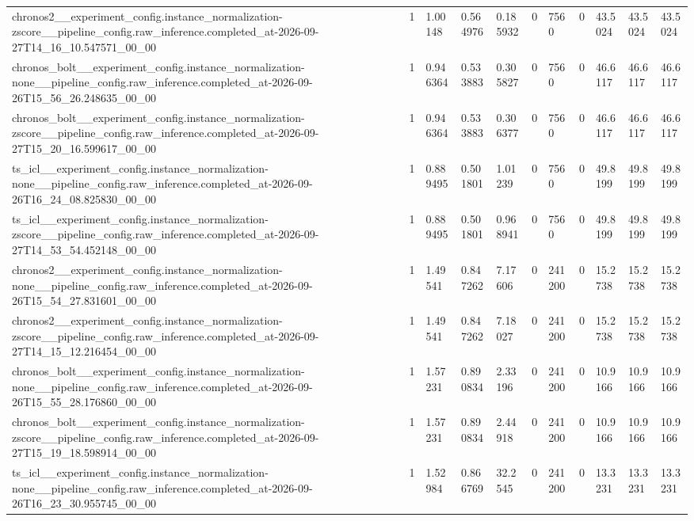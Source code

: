 \begin{tabular}{lllllllllll}
chronos2\_\_experiment\_config.instance\_normalization-zscore\_\_pipeline\_config.raw\_inference.completed\_at-2026-09-27T14\_16\_10.547571\_00\_00 & 1 & 1.00148 & 0.564976 & 0.185932 & 0 & 7560 & 0 & 43.5024 & 43.5024 & 43.5024 \\
chronos\_bolt\_\_experiment\_config.instance\_normalization-none\_\_pipeline\_config.raw\_inference.completed\_at-2026-09-26T15\_56\_26.248635\_00\_00 & 1 & 0.946364 & 0.533883 & 0.305827 & 0 & 7560 & 0 & 46.6117 & 46.6117 & 46.6117 \\
chronos\_bolt\_\_experiment\_config.instance\_normalization-zscore\_\_pipeline\_config.raw\_inference.completed\_at-2026-09-27T15\_20\_16.599617\_00\_00 & 1 & 0.946364 & 0.533883 & 0.306377 & 0 & 7560 & 0 & 46.6117 & 46.6117 & 46.6117 \\
ts\_icl\_\_experiment\_config.instance\_normalization-none\_\_pipeline\_config.raw\_inference.completed\_at-2026-09-26T16\_24\_08.825830\_00\_00 & 1 & 0.889495 & 0.501801 & 1.01239 & 0 & 7560 & 0 & 49.8199 & 49.8199 & 49.8199 \\
ts\_icl\_\_experiment\_config.instance\_normalization-zscore\_\_pipeline\_config.raw\_inference.completed\_at-2026-09-27T14\_53\_54.452148\_00\_00 & 1 & 0.889495 & 0.501801 & 0.968941 & 0 & 7560 & 0 & 49.8199 & 49.8199 & 49.8199 \\
chronos2\_\_experiment\_config.instance\_normalization-none\_\_pipeline\_config.raw\_inference.completed\_at-2026-09-26T15\_54\_27.831601\_00\_00 & 1 & 1.49541 & 0.847262 & 7.17606 & 0 & 241200 & 0 & 15.2738 & 15.2738 & 15.2738 \\
chronos2\_\_experiment\_config.instance\_normalization-zscore\_\_pipeline\_config.raw\_inference.completed\_at-2026-09-27T14\_15\_12.216454\_00\_00 & 1 & 1.49541 & 0.847262 & 7.18027 & 0 & 241200 & 0 & 15.2738 & 15.2738 & 15.2738 \\
chronos\_bolt\_\_experiment\_config.instance\_normalization-none\_\_pipeline\_config.raw\_inference.completed\_at-2026-09-26T15\_55\_28.176860\_00\_00 & 1 & 1.57231 & 0.890834 & 2.33196 & 0 & 241200 & 0 & 10.9166 & 10.9166 & 10.9166 \\
chronos\_bolt\_\_experiment\_config.instance\_normalization-zscore\_\_pipeline\_config.raw\_inference.completed\_at-2026-09-27T15\_19\_18.598914\_00\_00 & 1 & 1.57231 & 0.890834 & 2.44918 & 0 & 241200 & 0 & 10.9166 & 10.9166 & 10.9166 \\
ts\_icl\_\_experiment\_config.instance\_normalization-none\_\_pipeline\_config.raw\_inference.completed\_at-2026-09-26T16\_23\_30.955745\_00\_00 & 1 & 1.52984 & 0.866769 & 32.2545 & 0 & 241200 & 0 & 13.3231 & 13.3231 & 13.3231 \\

\end{tabular}
